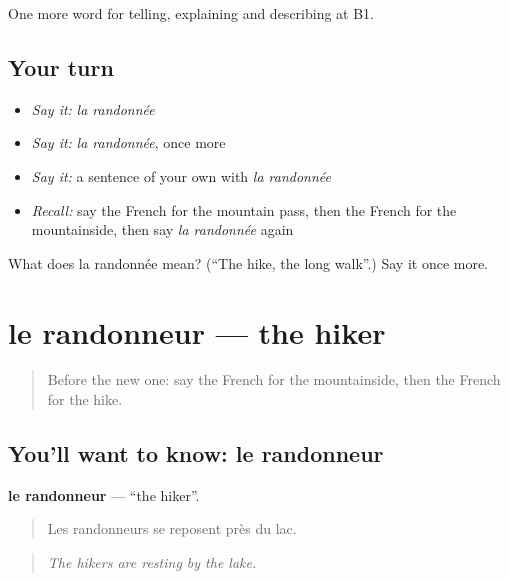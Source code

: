 \begin{grammarlens}[title={What you've built}]
One more word for telling, explaining and describing at B1.
\end{grammarlens}

\subsection*{Your turn}
\begin{itemize}
\raggedright
  \item \emph{Say it:} \emph{la randonnée}
  \item \emph{Say it:} \emph{la randonnée}, once more
  \item \emph{Say it:} a sentence of your own with \emph{la randonnée}
  \item \emph{Recall:} say the French for the mountain pass, then the French for the mountainside, then say \emph{la randonnée} again
\end{itemize}

\begin{tcolorbox}[breakable,colback=teal!4,colframe=teal!35!black,title={Before you move on}]
What does la randonnée mean? (\textquotedblleft{}The hike, the long walk\textquotedblright{}.) Say it once more.
\end{tcolorbox}
\section[le randonneur]{le randonneur — the hiker}

\label{lesson:FR-C455-randonneur}



\begin{quote}
Before the new one: say the French for the mountainside, then the French for the hike.
\end{quote}

\subsection*{You'll want to know: le randonneur}
\textbf{le randonneur} — \textquotedblleft{}the hiker\textquotedblright{}.

\begin{quote}
Les randonneurs se reposent près du lac.
\end{quote}

\begin{quote}
\emph{The hikers are resting by the lake.}
\end{quote}

